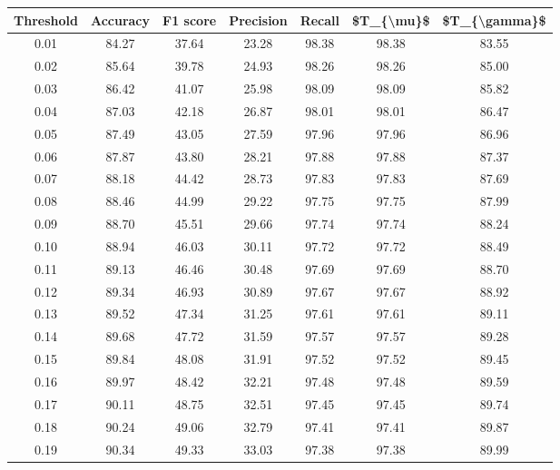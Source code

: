 \begin{tabular}{|c|c|c|c|c|c|c|}
\hline
 Threshold &  Accuracy &  F1 score &  Precision &  Recall &  \$T\_\{\textbackslash mu\}\$ &  \$T\_\{\textbackslash gamma\}\$ \\
\hline
      0.01 &     84.27 &     37.64 &      23.28 &   98.38 &      98.38 &         83.55 \\
      0.02 &     85.64 &     39.78 &      24.93 &   98.26 &      98.26 &         85.00 \\
      0.03 &     86.42 &     41.07 &      25.98 &   98.09 &      98.09 &         85.82 \\
      0.04 &     87.03 &     42.18 &      26.87 &   98.01 &      98.01 &         86.47 \\
      0.05 &     87.49 &     43.05 &      27.59 &   97.96 &      97.96 &         86.96 \\
      0.06 &     87.87 &     43.80 &      28.21 &   97.88 &      97.88 &         87.37 \\
      0.07 &     88.18 &     44.42 &      28.73 &   97.83 &      97.83 &         87.69 \\
      0.08 &     88.46 &     44.99 &      29.22 &   97.75 &      97.75 &         87.99 \\
      0.09 &     88.70 &     45.51 &      29.66 &   97.74 &      97.74 &         88.24 \\
      0.10 &     88.94 &     46.03 &      30.11 &   97.72 &      97.72 &         88.49 \\
      0.11 &     89.13 &     46.46 &      30.48 &   97.69 &      97.69 &         88.70 \\
      0.12 &     89.34 &     46.93 &      30.89 &   97.67 &      97.67 &         88.92 \\
      0.13 &     89.52 &     47.34 &      31.25 &   97.61 &      97.61 &         89.11 \\
      0.14 &     89.68 &     47.72 &      31.59 &   97.57 &      97.57 &         89.28 \\
      0.15 &     89.84 &     48.08 &      31.91 &   97.52 &      97.52 &         89.45 \\
      0.16 &     89.97 &     48.42 &      32.21 &   97.48 &      97.48 &         89.59 \\
      0.17 &     90.11 &     48.75 &      32.51 &   97.45 &      97.45 &         89.74 \\
      0.18 &     90.24 &     49.06 &      32.79 &   97.41 &      97.41 &         89.87 \\
      0.19 &     90.34 &     49.33 &      33.03 &   97.38 &      97.38 &         89.99 \\

\end{tabular}
